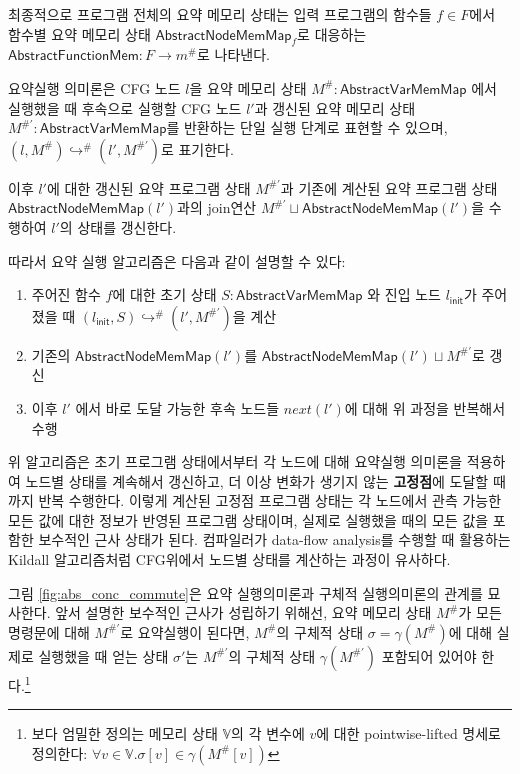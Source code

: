\documentclass[a4paper,12pt]{article}
\begin{document}
최종적으로 프로그램 전체의 요약 메모리 상태는 입력 프로그램의 함수들 $f \in F$에서 함수별 요약 메모리 상태 $\mathsf{AbstractNodeMemMap}_f$로 대응하는 $\mathsf{AbstractFunctionMem} : F \rightarrow m^{\#}$로 나타낸다.

요약실행 의미론은 CFG 노드 $l$을 요약 메모리 상태 $M^{\#} : \mathsf{AbstractVarMemMap}$ 에서 실행했을 때 후속으로 실행할 CFG 노드 $l'$과 갱신된 요약 메모리 상태 $M^{\#'} : \mathsf{AbstractVarMemMap}$를 반환하는
단일 실행 단계로 표현할 수 있으며, $(l, M^\#) \hookrightarrow^{\#} (l', M^{\#'})$로 표기한다.

이후 $l'$에 대한 갱신된 요약 프로그램 상태 $M^{\#'}$과 기존에 계산된 요약 프로그램 상태 $\mathsf{AbstractNodeMemMap}(l')$과의 join연산 $M^{\#'} \sqcup \mathsf{AbstractNodeMemMap}(l')$을 수행하여 $l'$의 상태를 갱신한다.

따라서 요약 실행 알고리즘은 다음과 같이 설명할 수 있다:
\begin{enumerate}
    \item 주어진 함수 $f$에 대한 초기 상태 $S : \mathsf{AbstractVarMemMap}$ 와 진입 노드 $l_{\mathsf{init}}$가 주어졌을 때 $(l_{\mathsf{init}}, S) \hookrightarrow^{\#} (l', M^{\#'})$을 계산
    \item 기존의 $\mathsf{AbstractNodeMemMap}(l')$를 $\mathsf{AbstractNodeMemMap}(l') \sqcup M^{\#'}$로 갱신
    \item 이후 $l'$ 에서 바로 도달 가능한 후속 노드들 $next(l')$에 대해 위 과정을 반복해서 수행
 \end{enumerate}

위 알고리즘은 초기 프로그램 상태에서부터 각 노드에 대해 요약실행 의미론을 적용하여 노드별 상태를 계속해서 갱신하고, 더 이상 변화가 생기지 않는 \textbf{고정점}에 도달할 때 까지 반복 수행한다. 
이렇게 계산된 고정점 프로그램 상태는 각 노드에서 관측 가능한 모든 값에 대한 정보가 반영된 프로그램 상태이며, 실제로 실행했을 때의 모든 값을 포함한 보수적인 근사 상태가 된다. 
컴파일러가 data-flow analysis를 수행할 때 활용하는 Kildall 알고리즘\cite{kildall1973}처럼 CFG위에서 노드별 상태를 계산하는 과정이 유사하다.

그림 \ref{fig:abs_conc_commute}은 요약 실행의미론과 구체적 실행의미론의 관계를 묘사한다. 
앞서 설명한 보수적인 근사가 성립하기 위해선, 요약 메모리 상태 $M^{\#}$가 모든 명령문에 대해 $M^{\#'}$로 요약실행이 된다면, $M^{\#}$의 구체적 상태 $\sigma = \gamma(M^{\#})$에 대해 실제로 실행했을 때 얻는 상태 $\sigma'$는 
 $M^{\#'}$의 구체적 상태 $\gamma(M^{\#'})$ 포함되어 있어야 한다.\footnote{보다 엄밀한 정의는 메모리 상태 $\mathbb{V}$의 각 변수에 $v$에 대한 pointwise-lifted 명세로 정의한다: $\forall v \in \mathbb{V}. \sigma[v] \in \gamma(M^{\#}[v])$}
\end{document}
